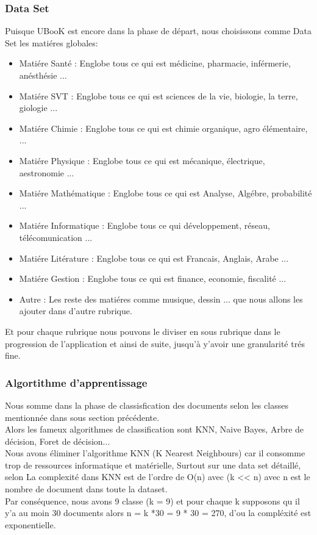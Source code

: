 \documentclass[12pt]{report}
\begin{document}
\subsubsection{Data Set}

Puisque UBooK est encore dans la phase de départ, nous choisissons comme Data Set les matiéres globales: 
\begin{itemize}
\item Matiére Santé : Englobe tous ce qui est médicine, pharmacie, inférmerie, anésthésie ...
\item Matiére SVT : Englobe tous ce qui est sciences de la vie, biologie, la terre, giologie ...
\item Matiére Chimie : Englobe tous ce qui est chimie organique, agro élémentaire, ...
\item Matiére Physique : Englobe tous ce qui est mécanique, électrique, aestronomie ...
\item Matiére Mathématique : Englobe tous ce qui est Analyse, Algébre, probabilité ...
\item Matiére Informatique : Englobe tous ce qui développement, réseau, télécomunication ...
\item Matiére Litérature : Englobe tous ce qui est Francais, Anglais, Arabe ...
\item Matiére Gestion : Englobe tous ce qui est finance, economie, fiscalité ...
\item Autre : Les reste des matiéres comme musique, dessin ... que nous allons les ajouter dans d'autre rubrique.
\end{itemize}
Et pour chaque rubrique nous pouvons le diviser en sous rubrique dans le progression de l'application et ainsi de suite, jusqu'à y'avoir une granularité trés fine. 

\subsubsection{Algortithme d'apprentissage}

Nous somme dans la phase de classisfication des documents selon les classes mentionnée dans sous section précédente.\\
Alors les fameux algorithmes de classification sont KNN, Naive Bayes, Arbre de décision, Foret de décision...\\
Nous avons éliminer l'algorithme KNN (K Nearest Neighbours) car il consomme trop de ressources informatique et matérielle, Surtout sur une data set détaillé, selon\cite{60} La complexité dans KNN est de l'ordre de O(n) avec (k << n) avec n est le nombre de document dans toute la dataset. \\
Par conséquence, nous avons 9 classe (k = 9) et pour chaque k supposons qu il y'a au moin 30 documents alors n = k *30 = 9 * 30 = 270, d'ou la compléxité est exponentielle.\\
\end{document}
